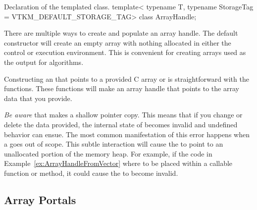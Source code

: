 \begin{vtkmexample}{Declaration of the \protect{} templated class.}
template<
    typename T,
    typename StorageTag = VTKM_DEFAULT_STORAGE_TAG>
class ArrayHandle;
\end{vtkmexample}

There are multiple ways to create and populate an array handle. The default
 constructor will create an empty array with nothing
allocated in either the control or execution environment. This is
convenient for creating arrays used as the output for algorithms.


Constructing an  that points to a provided C array or
 is straightforward with the
 functions. These functions will make an array
handle that points to the array data that you provide.



\emph{Be aware} that  makes a shallow pointer
copy. This means that if you change or delete the data provided, the
internal state of  becomes invalid and undefined
behavior can ensue. The most common manifestation of this error happens
when a  goes out of scope. This subtle interaction
will cause the  to point to an unallocated portion of
the memory heap. For example, if the code in
Example~\ref{ex:ArrayHandleFromVector} where to be placed within a callable
function or method, it could cause the  to become
invalid.


\subsection{Array Portals}
\label{sec:ArrayPortals}


